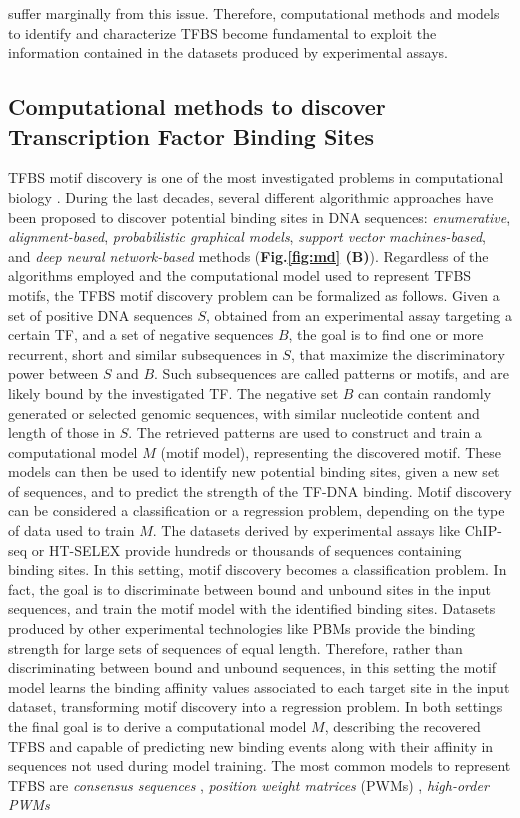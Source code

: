 \documentclass[a4paper, titlepage, openright]{book}
\begin{document}
suffer marginally from this issue. Therefore, computational methods and models to identify and characterize TFBS become fundamental to exploit the information contained in the datasets produced by experimental assays.
\subsection{Computational methods to discover Transcription Factor Binding Sites}
TFBS motif discovery is one of the most investigated problems in computational biology \citep{tognon2022survey}. During the last decades, several different algorithmic approaches have been proposed to discover potential binding sites in DNA sequences: \emph{enumerative}, \emph{alignment-based}, \emph{probabilistic graphical models}, \emph{support vector machines-based}, and \emph{deep neural network-based} methods (\textbf{Fig.\ref{fig:md} (B)}). Regardless of the algorithms employed and the computational model used to represent TFBS motifs, the TFBS motif discovery problem can be formalized as follows. Given a set of positive DNA sequences $S$, obtained from an experimental assay targeting a certain TF, and a set of negative sequences $B$, the goal is to find one or more recurrent, short and similar subsequences in $S$, that maximize the discriminatory power between $S$ and $B$. Such subsequences are called patterns or motifs, and are likely bound by the investigated TF. The negative set $B$ can contain randomly generated or selected genomic sequences, with similar nucleotide content and length of those in $S$. The retrieved patterns are used to construct and train a computational model $M$ (motif model), representing  the discovered motif. These models can then be used to identify new potential binding sites, given a new set of sequences, and to predict the strength of the TF-DNA binding. Motif discovery can be considered a classification or a regression problem, depending on the type of data used to train $M$. The datasets derived by experimental assays like ChIP-seq or HT-SELEX provide hundreds or thousands of sequences containing binding sites. In this setting, motif discovery becomes a classification problem. In fact, the goal is to discriminate between bound and unbound sites in the input sequences, and train the motif model with the identified binding sites. Datasets produced by other experimental technologies like PBMs provide the binding strength for large sets of sequences of equal length. Therefore, rather than discriminating between bound and unbound sequences, in this setting the motif model learns the binding affinity values associated to each target site in the input dataset, transforming motif discovery into a regression problem. In both settings the final goal is to derive a computational model $M$, describing the recovered TFBS and capable of predicting new binding events along with their affinity in sequences not used during model training. The most common models to represent TFBS are \emph{consensus sequences} \citep{day1992critical}, \emph{position weight matrices} (PWMs) \citep{stormo2000dna,stormo2013modeling}, \emph{high-order PWMs} 
\end{document}
